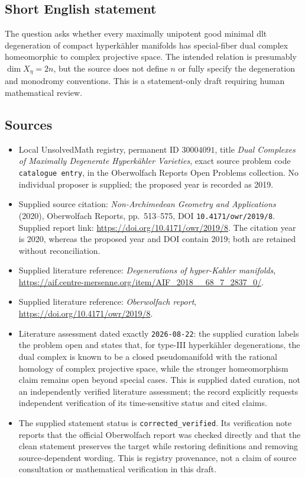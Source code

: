 \documentclass[11pt]{article}
\begin{document}
\subsection{Short English statement}
The question asks whether every maximally unipotent good minimal dlt degeneration of compact hyperkähler manifolds has special-fiber dual complex homeomorphic to complex projective space. The intended relation is presumably \(\dim X_\eta=2n\), but the source does not define \(n\) or fully specify the degeneration and monodromy conventions. This is a statement-only draft requiring human mathematical review.
\subsection{Sources}
\begin{itemize}
\item Local UnsolvedMath registry, permanent ID \(30004091\), title \emph{Dual Complexes of Maximally Degenerate Hyperkähler Varieties}, exact source problem code \texttt{catalogue entry}, in the Oberwolfach Reports Open Problems collection. No individual proposer is supplied; the proposed year is recorded as 2019.
\item Supplied source citation: \emph{Non-Archimedean Geometry and Applications} (2020), Oberwolfach Reports, pp.\ 513--575, DOI \texttt{10.4171/owr/2019/8}. Supplied report link: \url{https://doi.org/10.4171/owr/2019/8}. The citation year is 2020, whereas the proposed year and DOI contain 2019; both are retained without reconciliation.
\item Supplied literature reference: \emph{Degenerations of hyper-Kahler manifolds}, \url{https://aif.centre-mersenne.org/item/AIF_2018__68_7_2837_0/}.
\item Supplied literature reference: \emph{Oberwolfach report}, \url{https://doi.org/10.4171/owr/2019/8}.
\item Literature assessment dated exactly \texttt{2026-08-22}: the supplied curation labels the problem open and states that, for type-III hyperkähler degenerations, the dual complex is known to be a closed pseudomanifold with the rational homology of complex projective space, while the stronger homeomorphism claim remains open beyond special cases. This is supplied dated curation, not an independently verified literature assessment; the record explicitly requests independent verification of its time-sensitive status and cited claims.
\item The supplied statement status is \texttt{corrected\_verified}. Its verification note reports that the official Oberwolfach report was checked directly and that the clean statement preserves the target while restoring definitions and removing source-dependent wording. This is registry provenance, not a claim of source consultation or mathematical verification in this draft.
\end{itemize}
\end{document}
